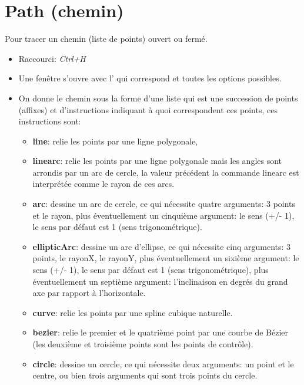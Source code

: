 \section{Path (chemin)}

Pour tracer un chemin (liste de points) ouvert ou fermé.

\begin{itemize}
\item Raccourci: \textsl{Ctrl+H}
\item Une fenêtre s'ouvre avec l' qui correspond et toutes les options possibles.
\item On donne le chemin sous la forme d'une liste qui est une succession de points (affixes) et d'instructions
indiquant à quoi correspondent ces points, ces instructions sont: 
\begin{itemize}
 \item \textbf{line}: relie les points par une ligne polygonale,

 \item  \textbf{linearc}: relie les points par une ligne polygonale mais les angles sont arrondis par un arc de cercle, la valeur précédent la commande linearc est interprétée comme le rayon de ces arcs.

 \item \textbf{arc}: dessine un arc de cercle, ce qui nécessite quatre arguments: 3 points et le rayon, plus éventuellement un cinquième argument: le sens (+/- 1), le sens par défaut est 1 (sens trigonométrique).

 \item \textbf{ellipticArc}: dessine un arc d'ellipse, ce qui nécessite cinq arguments: 3 points, le rayonX, le rayonY, plus éventuellement un sixième argument: le sens (+/- 1), le sens par défaut est 1 (sens trigonométrique), plus éventuellement un septième argument: l'inclinaison en degrés du grand axe par rapport à l'horizontale.

 \item \textbf{curve}: relie les points par une spline cubique naturelle.

 \item \textbf{bezier}: relie le premier et le quatrième point par une courbe de Bézier (les deuxième et troisième points sont les points de contrôle).

 \item \textbf{circle}: dessine un cercle, ce qui nécessite deux arguments: un point et le centre, ou bien trois arguments qui sont trois points du cercle.


\end{itemize}
\end{itemize}
